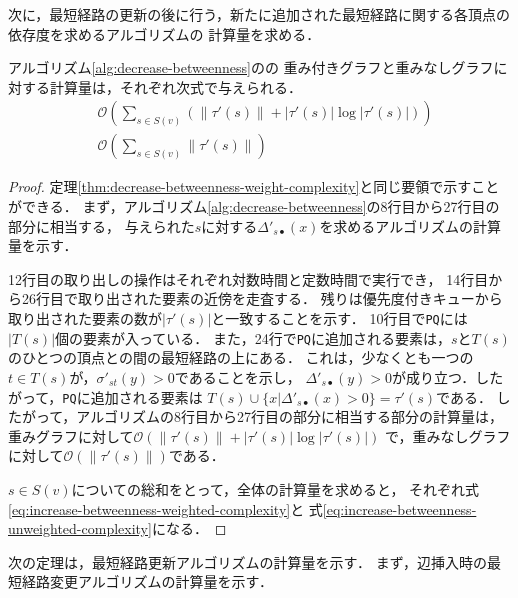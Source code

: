 次に，最短経路の更新の後に行う，新たに追加された最短経路に関する各頂点の依存度を求めるアルゴリズムの
計算量を求める．

\begin{theorem}
  \label{thm:increase-betweenness-weight-complexity}
  アルゴリズム\ref{alg:decrease-betweenness}のの
  重み付きグラフと重みなしグラフに対する計算量は，それぞれ次式で与えられる．
  \begin{align}
    &\mathcal{O}(\sum_{s\in S(v)}(\|\tau'(s)\|+|\tau'(s)|\log|\tau'(s)|))
    \label{eq:increase-betweenness-weighted-complexity} \\
    &\mathcal{O}(\sum_{s\in S(v)}\|\tau'(s)\|)
    \label{eq:increase-betweenness-unweighted-complexity}
  \end{align}
\end{theorem}
\begin{proof}
  定理\ref{thm:decrease-betweenness-weight-complexity}と同じ要領で示すことができる．
  まず，アルゴリズム\ref{alg:decrease-betweenness}の8行目から27行目の部分に相当する，
  与えられた$s$に対する$\Delta'_{s\bullet}(x)$を求めるアルゴリズムの計算量を示す．

  12行目の取り出しの操作はそれぞれ対数時間と定数時間で実行でき，
  14行目から26行目で取り出された要素の近傍を走査する．
  残りは優先度付きキューから取り出された要素の数が$|\tau'(s)|$と一致することを示す．
  10行目で\texttt{PQ}には$|T(s)|$個の要素が入っている．
  また，24行で\texttt{PQ}に追加される要素は，$s$と$T(s)$のひとつの頂点との間の最短経路の上にある．
  これは，少なくとも一つの$t\in T(s)$が，$\sigma'_{st}(y)>0$であることを示し，
  $\Delta'_{s\bullet}(y)>0$が成り立つ．したがって，\texttt{PQ}に追加される要素は
  $T(s)\cup\{x|\Delta'_{s\bullet}(x)>0\}=\tau'(s)$である．
  したがって，アルゴリズムの8行目から27行目の部分に相当する部分の計算量は，
  重みグラフに対して$\mathcal{O}(\|\tau'(s)\|+|\tau'(s)|\log|\tau'(s)|)$
  で，重みなしグラフに対して$\mathcal{O}(\|\tau'(s)\|)$である．

  $s\in S(v)$についての総和をとって，全体の計算量を求めると，
  それぞれ式\eqref{eq:increase-betweenness-weighted-complexity}と
  式\eqref{eq:increase-betweenness-unweighted-complexity}になる．

\end{proof}

次の定理は，最短経路更新アルゴリズムの計算量を示す．
まず，辺挿入時の最短経路変更アルゴリズムの計算量を示す．

